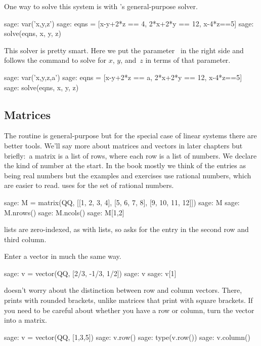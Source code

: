 One way to solve this system is with \Sage's general-purpose solver.
\begin{sagecommandline}
sage: var('x,y,z')                                  
sage: eqns = [x-y+2*z == 4, 2*x+2*y == 12, x-4*z==5]
sage: solve(eqns, x, y, z)                            
\end{sagecommandline}
This solver is pretty smart.
Here we put the parameter~ in the right side 
and \Sage{} follows the
command  to 
solve for $x$, $y$, and~$z$ in terms of that parameter.
\begin{sagecommandline}
sage: var('x,y,z,a')                                
sage: eqns = [x-y+2*z == a, 2*x+2*y == 12, x-4*z==5]
sage: solve(eqns, x, y, z) 
\end{sagecommandline}



\subsection{Matrices}
The  routine is general-purpose but 
for the special case of linear systems there are better tools.
We'll say more about matrices and vectors in later chapters but 
briefly:~a \Sage{} matrix is a list of rows, where
each row is a list of numbers. 
We declare the kind of number at the start.
In the book mostly we think of the entries as being real numbers
but the examples and exercises use rational numbers, which are
easier to read.
\Sage{} uses  for the set of rational numbers.
\begin{sagecommandline}
sage: M = matrix(QQ, [[1, 2, 3, 4], [5, 6, 7, 8], [9, 10, 11, 12]])
sage: M
sage: M.nrows()
sage: M.ncols()
sage: M[1,2]
\end{sagecommandline}
\Sage{} lists are zero-indexed, as with \python{} lists, 
so  asks
for the entry in the second row and third column. 

Enter a vector in much the same way.
\begin{sagecommandline}
sage: v = vector(QQ, [2/3, -1/3, 1/2])
sage: v
sage: v[1]
\end{sagecommandline}
\Sage{} doesn't worry about the distinction between row and column
vectors.
There,  prints with rounded brackets, unlike matrices
that print with square brackets.
If you need to be careful about whether you have a row or column, turn the 
vector into a matrix.
\begin{sagecommandline}
sage: v = vector(QQ, [1,3,5])
sage: v.row()
sage: type(v.row())
sage: v.column()
\end{sagecommandline}


